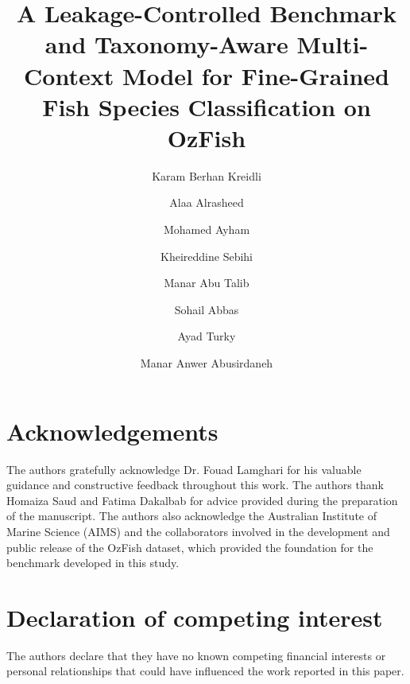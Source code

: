 \documentclass[preprint,12pt]{elsarticle}
\begin{document}
\begin{frontmatter}
\title{A Leakage-Controlled Benchmark and Taxonomy-Aware Multi-Context Model for Fine-Grained Fish Species Classification on OzFish}
\author[1]{Karam Berhan Kreidli}
\author[1]{Alaa Alrasheed}
\author[1]{Mohamed Ayham}
\author[1]{Kheireddine Sebihi}
\author[1]{Manar Abu Talib}
\author[1]{Sohail Abbas}
\author[1]{Ayad Turky}
\author[1,2]{Manar Anwer Abusirdaneh}



\end{frontmatter}
\section*{Acknowledgements}
The authors gratefully acknowledge Dr. Fouad Lamghari for his valuable
guidance and constructive feedback throughout this work. The authors
thank Homaiza Saud and Fatima Dakalbab for advice provided during the
preparation of the manuscript. The authors
also acknowledge the Australian Institute of Marine Science (AIMS) and
the collaborators involved in the development and public release of the
OzFish dataset, which provided the foundation for the benchmark
developed in this study.

\section*{Declaration of competing interest}
The authors declare that they have no known competing financial
interests or personal relationships that could have influenced the work
reported in this paper.
\end{document}
